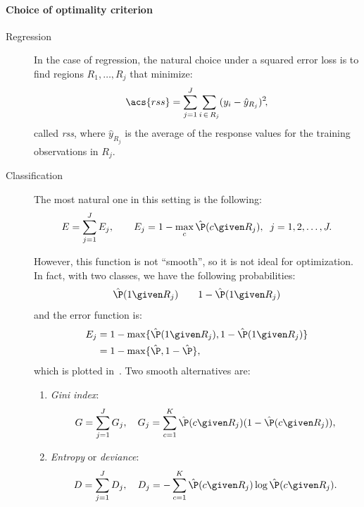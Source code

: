 \paragraph{Choice of optimality criterion}

\begin{description}
    \item[Regression] In the case of regression, the natural choice under a squared error loss is to find regions $R_1, \ldots, R_j$ that minimize:
          \begin{equation}
              \acs{rss} = \sum_{j=1}^J \sum_{i\,\in\,R_j} (y_i - \hat{y}_{R_j})^2\negthinspace,
          \end{equation}
          called \emph{\acl{rss}}, where $\hat{y}_{R_j}$ is the average of the response values for the training observations in $R_j$.

    \item[Classification] The most natural one in this setting is the following:
          \begin{equation}
              E = \sum_{j=1}^J E_j, \qquad E_j = 1 - \max_c \hat{\P}(c\given R_j), \;\; j = 1,2,\dots,J.
          \end{equation}

          However, this function is not ``smooth''\negthinspace, so it is not ideal for optimization. In fact, with two classes, we have the following probabilities:
          \begin{equation}
              \hat{\P}(1\given R_j) \qquad 1 - \hat{\P}(1\given R_j)
          \end{equation}
          and the error function is:
          \begin{equation}
              \begin{aligned}
                  E_j & = 1 - \max\{\hat{\P}(1\given R_j), 1 - \hat{\P}(1\given R_j)\} \\
                      & = 1 - \max\{\hat{\P}, 1 - \hat{\P}\},
              \end{aligned}
          \end{equation}
          which is plotted in~. Two smooth alternatives are:
          \begin{enumerate}
              \item \emph{Gini index}:
                    \begin{equation}
                        G = \sum_{j=1}^J G_j, \quad G_j = \sum_{c = 1}^K \hat{\P}(c\given R_j)(1 - \hat{\P}(c\given R_j)),
                    \end{equation}
              \item \emph{Entropy} or \emph{deviance}:
                    \begin{equation}
                        D = \sum_{j=1}^J D_j, \quad D_j = -\sum_{c = 1}^K \hat{\P}(c\given R_j) \log \hat{\P}(c\given R_j).
                    \end{equation}
          \end{enumerate}
\end{description}

